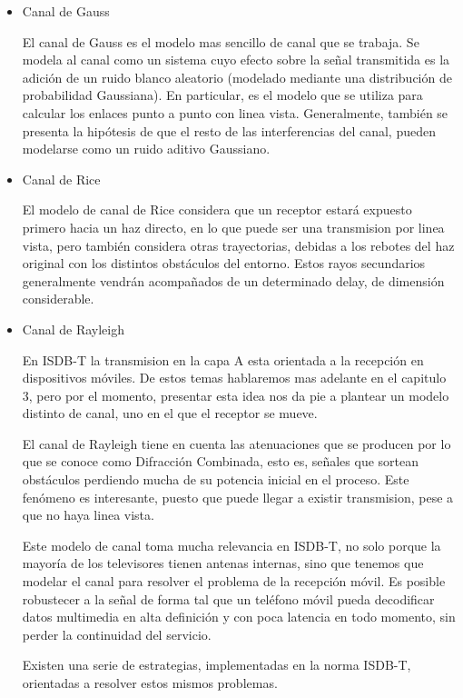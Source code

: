\begin{itemize}
	\item Canal de Gauss
	
El canal de Gauss es el modelo mas sencillo de canal que se trabaja. Se modela al canal como un sistema cuyo efecto sobre la señal transmitida es la adición de un ruido blanco aleatorio (modelado mediante una distribución de probabilidad Gaussiana). En particular, es el modelo que se utiliza para calcular los enlaces punto a punto con linea vista. Generalmente, también se presenta la hipótesis de que el resto de las interferencias del canal, pueden modelarse como un ruido aditivo Gaussiano.
	
	\item Canal de Rice

El modelo de canal de Rice considera que un receptor estará expuesto primero hacia un haz directo, en lo que puede ser una transmision por linea vista, pero también considera otras trayectorias, debidas a los rebotes del haz original con los distintos obstáculos del entorno. Estos rayos secundarios generalmente vendrán acompañados de un determinado delay, de dimensión considerable.

	\item Canal de Rayleigh

En ISDB-T la transmision en la capa A esta orientada a la recepción en dispositivos móviles. De estos temas hablaremos mas adelante en el capitulo 3, pero por el momento, presentar esta idea nos da pie a plantear un modelo distinto de canal, uno en el que el receptor se mueve. 

El canal de Rayleigh tiene en cuenta las atenuaciones que se producen por lo que se conoce como Difracción Combinada, esto es, señales que sortean obstáculos perdiendo mucha de su potencia inicial en el proceso. Este fenómeno es interesante, puesto que puede llegar a existir transmision, pese a que no haya linea vista. 

Este modelo de canal toma mucha relevancia en ISDB-T, no solo porque la mayoría de los televisores tienen antenas internas, sino que tenemos que modelar el canal para resolver el problema de la recepción móvil. Es posible robustecer a la señal de forma tal que un teléfono móvil pueda decodificar datos multimedia en alta definición y con poca latencia en todo momento, sin perder la continuidad del servicio. 

Existen una serie de estrategias, implementadas en la norma ISDB-T, orientadas a resolver estos mismos problemas.

\end{itemize}

